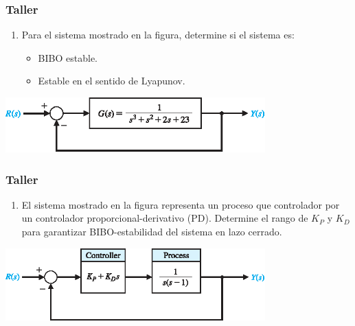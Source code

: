 \documentclass[aspectratio=169,handout]{beamer}
\theoremstyle{definition}
\theoremstyle{plain}
\theoremstyle{remark}
\newcounter{saveenumi}
\newcommand{\seti}{\setcounter{saveenumi}{\value{enumi}}}
\newcommand{\conti}{\setcounter{enumi}{\value{saveenumi}}}
\begin{document}
\begin{frame}[c]\frametitle{Taller}
\begin{enumerate}
  \conti
  \item Para el sistema mostrado en la figura, determine si el sistema es:
  \begin{itemize}
    \item BIBO estable.
    \item Estable en el sentido de Lyapunov.
  \end{itemize}
  \seti
\end{enumerate}
  \begin{center}
    \includegraphics[width=10cm]{images/stability.eps}
  \end{center}
\end{frame}

\begin{frame}[c]\frametitle{Taller}
\begin{enumerate}
  \conti
  \item El sistema mostrado en la figura representa un proceso que controlador por un controlador proporcional-derivativo (PD). Determine el rango de $K_P$ y $K_D$ para garantizar BIBO-estabilidad del sistema en lazo cerrado.
\end{enumerate}
  \begin{center}
    \includegraphics[width=10cm]{images/stability_PD.eps}
  \end{center}
\end{frame}

\end{document}
